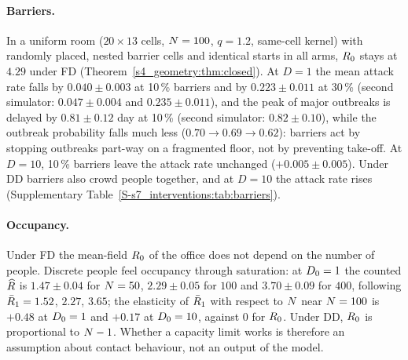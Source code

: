 \paragraph{Barriers.} In a uniform room ($20\times13$ cells, $N=100$, $q=1.2$, same-cell kernel) with
randomly placed, nested barrier cells and identical starts in all arms, $R_0$ stays at $4.29$ under FD
(Theorem~\ref{s4_geometry:thm:closed}). At $D=1$ the mean attack rate falls by $0.040\pm0.003$ at 10\,\%
barriers and by $0.223\pm0.011$ at 30\,\% (second simulator: $0.047\pm0.004$ and $0.235\pm0.011$), and the peak
of major outbreaks is delayed by $0.81\pm0.12$ day at 10\,\% (second simulator: $0.82\pm0.10$), while the
outbreak probability falls much less ($0.70\to0.69\to0.62$): barriers act by stopping outbreaks part-way on a
fragmented floor, not by preventing take-off. At $D=10$, 10\,\% barriers leave the attack rate unchanged
($+0.005\pm0.005$). Under DD barriers also crowd people together, and at $D=10$ the attack rate rises
(Supplementary Table~\ref{S-s7_interventions:tab:barriers}).

\paragraph{Occupancy.} Under FD the mean-field $R_0$ of the office does not depend on the number of people.
Discrete people feel occupancy through saturation: at $D_0=1$ the counted $\widehat{R}$ is $1.47\pm0.04$ for
$N=50$, $2.29\pm0.05$ for $100$ and $3.70\pm0.09$ for $400$, following $\bar{R}_1=1.52$, $2.27$, $3.65$; the
elasticity of $\bar{R}_1$ with respect to $N$ near $N=100$ is $+0.48$ at $D_0=1$ and $+0.17$ at $D_0=10$,
against $0$ for $R_0$. Under DD, $R_0$ is proportional to $N-1$. Whether a capacity limit works is therefore
an assumption about contact behaviour, not an output of the model.

